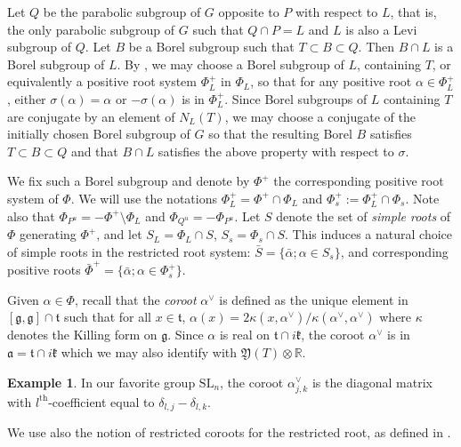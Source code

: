 \documentclass{amsart}
\theoremstyle{definition}
\newtheorem{exa}[thm]{Example}
\begin{document}
Let $Q$ be the parabolic subgroup of $G$ opposite to $P$ with respect 
to $L$, that is, the only parabolic subgroup of $G$ such that $Q\cap P=L$ and 
$L$ is also a Levi subgroup of $Q$. 
Let $B$ be a Borel subgroup such that $T\subset B \subset Q$. 
Then $B\cap L$ is a Borel subgroup of $L$. 
By \cite[Lemma 1.2]{DCP83},
we may choose a Borel subgroup of $L$, containing $T$, or equivalently 
a positive root system $\Phi_L^+$ in $\Phi_L$, so that for any positive 
root $\alpha\in \Phi_L^+$, either $\sigma(\alpha)=\alpha$ or $-\sigma(\alpha)$
is in $\Phi_L^+$.
Since Borel subgroups of $L$ containing $T$ are conjugate by an element
of $N_L(T)$, we may choose a conjugate of the initially chosen Borel 
subgroup of $G$ so that the resulting Borel $B$ satisfies 
$T\subset B\subset Q$ and that $B\cap L$ satisfies the above property 
with respect to $\sigma$.

We fix such a Borel subgroup and denote by $\Phi^+$ the corresponding 
positive root system of $\Phi$. We will use the notations 
$\Phi_L^+=\Phi^+\cap \Phi_L$ and $\Phi_s^+ := \Phi_L^+ \cap \Phi_s$. 
Note also that $\Phi_{P^u}=-\Phi^+ \setminus \Phi_L$ and 
$\Phi_{Q^u}=-\Phi_{P^u}$. 
Let $S$ denote the set of \emph{simple roots} of $\Phi$ generating $\Phi^+$,
and let $S_L=\Phi_L\cap S$, $S_s=\Phi_s\cap S$.
This induces a natural choice of simple roots in the restricted 
root system: $\bar{S}=\{\bar{\alpha};\alpha\in S_s\}$, and corresponding 
positive roots $\bar{\Phi}^+=\{\bar{\alpha};\alpha\in \Phi_s^+\}$.

Given $\alpha\in \Phi$, recall that the \emph{coroot} $\alpha^{\vee}$ is 
defined as the unique element in $[\mathfrak{g},\mathfrak{g}]\cap \mathfrak{t}$
such that for all $x\in \mathfrak{t}$, 
$\alpha(x)=2\kappa(x,\alpha^{\vee})/\kappa(\alpha^{\vee},\alpha^{\vee})$
where $\kappa$ denotes the Killing form on $\mathfrak{g}$.
Since $\alpha$ is real on $\mathfrak{t}\cap i\mathfrak{k}$, 
the coroot $\alpha^{\vee}$ is in $\mathfrak{a}=\mathfrak{t}\cap i\mathfrak{k}$ 
which we may also identify with $\mathfrak{Y}(T)\otimes \mathbb{R}$.

\begin{exa}
\label{exa_coroot_sl}
In our favorite group $\mathrm{SL}_n$, the coroot $\alpha_{j,k}^{\vee}$ 
is the diagonal matrix with $l^{\mathrm{th}}$-coefficient equal 
to $\delta_{l,j}-\delta_{l,k}$.
\end{exa}

We use also the notion of restricted coroots for the restricted root, 
as defined in \cite[Section 2.3]{Vus90}. 
\end{document}
